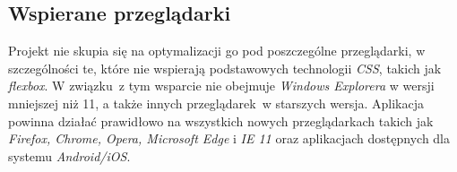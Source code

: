 \subsection{Wspierane przeglądarki}
\label{sec:przegladarki}
Projekt nie skupia się na optymalizacji go pod poszczególne przeglądarki, w szczególności te, które nie wspierają podstawowych technologii \textit{CSS}, takich jak \textit{flexbox}\cite{mdn}. W związku~z tym wsparcie nie obejmuje \textit{Windows Explorera} w wersji mniejszej niż 11, a także innych przeglądarek~w starszych wersja. Aplikacja powinna działać prawidłowo na wszystkich nowych przeglądarkach takich jak \textit{Firefox, Chrome, Opera, Microsoft Edge} i \textit{IE 11} oraz aplikacjach dostępnych dla systemu \textit{Android/iOS}.
